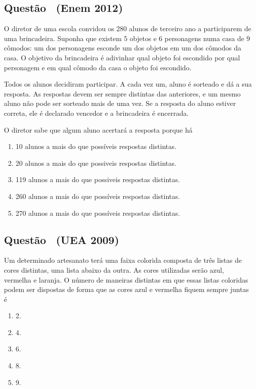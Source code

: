 \documentclass[12pt]{article}
\newcounter{questao}
\newcommand{\novaquestao}[1]{%
	\stepcounter{questao}%
	\subsection*{Questão \thequestao\ (#1)}%
}
\begin{document}
\begin{multicols}{2}
        \novaquestao{Enem 2012}

            O diretor de uma escola convidou os 280 alunos de terceiro ano a participarem de uma brincadeira. Suponha que existem 5 objetos e 6 personagens numa casa de 9 cômodos: um dos personagens esconde um dos objetos em um dos cômodos da casa. O objetivo da brincadeira é adivinhar qual objeto foi escondido por qual personagem e em qual cômodo da casa o objeto foi escondido.

            Todos os alunos decidiram participar. A cada vez um, aluno é sorteado e dá a sua resposta. As respostas devem ser sempre distintas das anteriores, e um mesmo aluno não pode ser sorteado mais de uma vez. Se a resposta do aluno estiver correta, ele é declarado vencedor e a brincadeira é encerrada.
            
            O diretor sabe que algum aluno acertará a resposta porque há

                \begin{enumerate}[label=(\alph*), noitemsep]
                \item 10 alunos a mais do que possíveis respostas distintas.
                \item 20 alunos a mais do que possiveis respostas distintas.
                \item 119 alunos a mais do que possiveis respostas distintas.
                \item 260 alunos a mais do que possíveis respostas distintas.
                \item 270 alunos a mais do que possíveis respostas distintas.
                \end{enumerate}


        \novaquestao{UEA 2009}

            Um determinado artesanato terá uma faixa colorida composta de três listas de cores distintas, uma lista abaixo da outra. As cores utilizadas serão azul, vermelha e laranja. O número de maneiras distintas em que essas listas coloridas podem ser dispostas de forma que as cores azul e vermelha fiquem sempre juntas é 

                \begin{enumerate}[label=(\alph*), noitemsep]
                \item 2.
                \item 4.
                \item 6.
                \item 8.
                \item 9.
                \end{enumerate}


\end{multicols}
\end{document}
